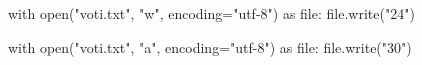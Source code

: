 \begin{unipdcode}[language=Python]
with open("voti.txt", "w", encoding="utf-8") as file:
    file.write("24\n")

with open("voti.txt", "a", encoding="utf-8") as file:
    file.write("30\n")
\end{unipdcode}
